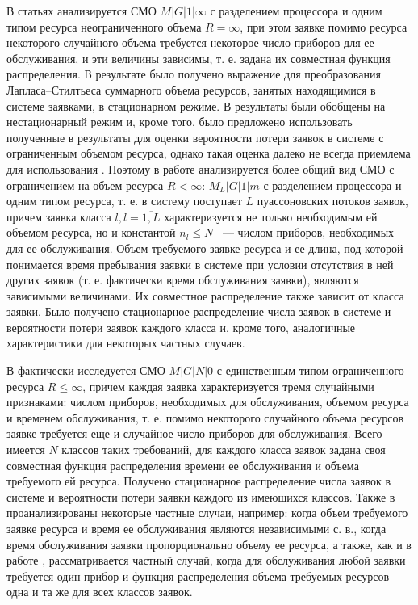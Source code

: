\documentclass[a4paper,12pt]{article}
\begin{document}
В статьях \cite{Sengupta,Tihonenko_40_2002} анализируется СМО $M|G|1|\infty$ с разделением процессора и одним типом ресурса неограниченного объема $R=\infty$, при этом заявке помимо ресурса некоторого случайного объема требуется некоторое число приборов для ее обслуживания, и эти величины зависимы, т. е. задана их совместная функция распределения. В результате было получено выражение для преобразования Лапласа--Стилтьеса суммарного объема ресурсов, занятых находящимися в системе заявками, в стационарном режиме.
В \cite{Tihonenko_40_2002} результаты были обобщены на нестационарный режим и, кроме того, было предложено использовать полученные в \cite{Sengupta} результаты для оценки вероятности потери заявок в системе с ограниченным объемом ресурса, однако такая оценка далеко не всегда приемлема для использования \cite{Tihonenko_40_2002}.
Поэтому в работе \cite{Tihonenko_25_2010} анализируется более общий вид СМО с ограничением на объем ресурса $R<\infty$: $M_{L}|G|1|m$ с разделением процессора и одним типом ресурса, т. е. в систему поступает $L$ пуассоновских потоков заявок, причем заявка класса $l, l=\overline{1,L}$ характеризуется не только необходимым ей объемом ресурса, но и константой $n_l\leq N$ ~--- числом приборов, необходимых для ее обслуживания.
Объем требуемого заявке ресурса и ее длина, под которой понимается время пребывания заявки в системе при условии отсутствия в ней других заявок (т. е. фактически время обслуживания заявки), являются зависимыми величинами. Их совместное распределение также зависит от класса заявки. Было получено стационарное распределение числа заявок в системе и вероятности потери заявок каждого класса и, кроме того,  аналогичные характеристики для некоторых частных случаев.

В \cite{Tihonenko_26_2005} фактически исследуется СМО $M|G|N|0$ с единственным типом ограниченного ресурса $R\leq \infty$, причем каждая заявка характеризуется тремя случайными признаками: числом приборов, необходимых для обслуживания, объемом ресурса и временем обслуживания, т. е. помимо некоторого случайного объема ресурсов заявке требуется еще и случайное число приборов для обслуживания. Всего имеется $N$ классов таких требований, для каждого класса заявок задана своя совместная функция распределения времени ее обслуживания и объема требуемого ей ресурса. Получено стационарное распределение числа заявок в системе и вероятности потери заявки каждого из имеющихся классов. Также в \cite{Tihonenko_26_2005} проанализированы некоторые частные случаи, например: когда объем требуемого заявке ресурса и время ее обслуживания являются независимыми с. в., когда время обслуживания заявки пропорционально объему ее ресурса, а также, как и в работе \cite{Romm_21_1971}, рассматривается частный случай, когда для обслуживания любой заявки требуется один прибор и функция распределения объема требуемых ресурсов одна и та же для всех классов заявок.
\end{document}
